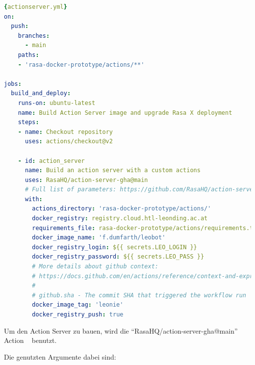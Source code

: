 \begin{lstlisting}[language=yaml,label={lst:actionserveryml},caption={action\_server.yml}]{actionserver.yml}
on:
  push:
    branches:
      - main
    paths:
    - 'rasa-docker-prototype/actions/**'

jobs:
  build_and_deploy:
    runs-on: ubuntu-latest
    name: Build Action Server image and upgrade Rasa X deployment
    steps:
    - name: Checkout repository
      uses: actions/checkout@v2

    - id: action_server
      name: Build an action server with a custom actions
      uses: RasaHQ/action-server-gha@main
      # Full list of parameters: https://github.com/RasaHQ/action-server-gha/tree/master#input-arguments
      with:
        actions_directory: 'rasa-docker-prototype/actions/'
        docker_registry: registry.cloud.htl-leonding.ac.at
        requirements_file: rasa-docker-prototype/actions/requirements.txt
        docker_image_name: 'f.dumfarth/leobot'
        docker_registry_login: ${{ secrets.LEO_LOGIN }}
        docker_registry_password: ${{ secrets.LEO_PASS }}
        # More details about github context:
        # https://docs.github.com/en/actions/reference/context-and-expression-syntax-for-github-actions#github-context
        #
        # github.sha - The commit SHA that triggered the workflow run
        docker_image_tag: 'leonie'
        docker_registry_push: true
\end{lstlisting}

Um den Action Server zu bauen, wird die ``RasaHQ/action-server-gha@main'' Action ~\cite{actionServerAction} benutzt.

Die genutzten Argumente dabei sind:


